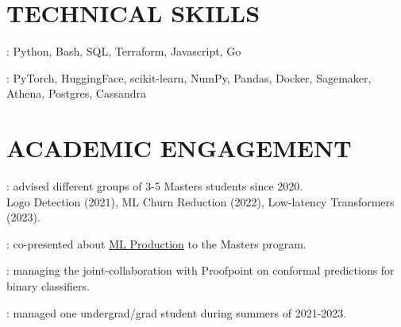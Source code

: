 \documentclass[resmargin]{resume_style_class} %
\newenvironment{outline-cond}
  {\begin{list}{}{
  \setlength{\leftmargin}{30pt}
  \setlength\topsep{-10pt}
  \setlength\itemindent{-30pt}
  }}
  {\end{list}}
\begin{document}
\begin{resume}
\section{TECHNICAL SKILLS}
\begin{outline-cond} 
	\item  {}: Python, Bash, SQL, Terraform, Javascript, Go
	\item  {}: PyTorch, HuggingFace, scikit-learn, NumPy, Pandas, Docker, Sagemaker, Athena, Postgres, Cassandra
\end{outline-cond} 


\section{ACADEMIC ENGAGEMENT}
\begin{outline-cond} 
	\item {}: advised different groups of 3-5 Masters students since 2020. \\Logo Detection (2021), ML Churn Reduction (2022), Low-latency Transformers (2023).
	\item {}: co-presented about \href{https://stat.duke.edu/events/machine-learning-metamorphosis-breaking-models-out-your-local-machine-and-releasing-them}{ML Production} to the Masters program. 
	\item {}: managing the joint-collaboration with Proofpoint on conformal predictions for binary classifiers.
	\item {}: managed one undergrad/grad student during summers of 2021-2023.
\end{outline-cond} 






\end{resume}
\end{document}
